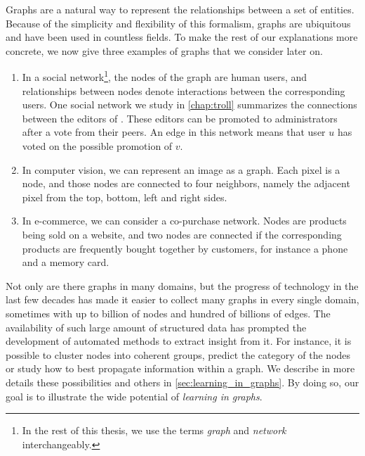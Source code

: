 Graphs are a natural way to represent the relationships between a set of entities. Because of the
simplicity and flexibility of this formalism, graphs are ubiquitous and have been used in countless
fields. To make the rest of our explanations more concrete, we now give three examples of graphs
that we consider later on.
\begin{enumerate}[nosep]%
\item In a social network\footnote{In the rest of this thesis, we use the terms \emph{graph} and
\emph{network} interchangeably.}, the nodes of the graph are human users, and relationships
between nodes denote interactions between the corresponding users. One social network we study
in \autoref{chap:troll} summarizes the connections between the editors of \wik{}. These editors
can be promoted to administrators after a vote from their peers. An edge \euv{} in this network
means that user $u$ has voted on the possible promotion of $v$.
\item In computer vision, we can represent an image as a graph. Each pixel is a node, and those
nodes are connected to four neighbors, namely the adjacent pixel from the top, bottom, left and
right sides.
\item In e-commerce, we can consider a co-purchase network. Nodes are products being sold on a
website, and two nodes are connected if the corresponding products are frequently bought
together by customers, for instance a phone and a memory card.
\end{enumerate}

Not only are there graphs in many domains, but the progress of technology in the last few decades
has made it easier to collect many graphs in every single domain, sometimes with up to billion of
nodes and hundred of billions of edges. The availability of such large amount of structured data has
prompted the development of automated methods to extract insight from it. For instance, it is
possible to cluster nodes into coherent groups, predict the category of the nodes or study how to
best propagate information within a graph. We describe in more details these possibilities and
others in \autoref{sec:learning_in_graphs}. By doing so, our goal is to illustrate the wide
potential of \emph{learning in graphs}.

\medskip

